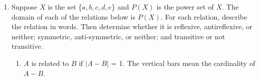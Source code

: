 \documentclass{article}
\begin{document}
\begin{enumerate}
\begin{itemize}
    \item Matrix:\\
        $\begin{pNiceMatrix}[first-row,first-col]
           & 1 & 2 & 6 & 7 & 11  \\
        1  & 1 & 0 & 0 & 1 & 0   \\ 
        2  & 0 & 1 & 0 & 0 & 1   \\
        6  & 0 & 0 & 1 & 0 & 0   \\
        7  & 1 & 0 & 0 & 1 & 0   \\
        11 & 0 & 1 & 0 & 0 & 1   \\
        \end{pNiceMatrix}$
        \hspace{1cm} Matrix = 
        $\begin{cases}
            1: m \equiv n \pmod{3}\\
            0: otherwise\\  
        \end{cases}$ \\
    
    \item \begin{itemize}
        \item R is reflexive as the diagnol of the matrix consist on only 1's.
        \item R is symmetric as since $\forall$ $m$ and $n$, (m,n) and (n,m) are 1's.
        \item R is transitive as $\forall$ $m$ and $n \in R$, if $mRn$ and $nRm$ then $mRm$ and $nRn$.
     \end{itemize}
    \item R is an equivalence relation since it is reflexive,symmetric, and transitive for the reasons mentioned above.
\end{itemize}

\pagebreak %

\item Suppose $X$ is the set \{$a,b,c,d,e$\} and $P(X)$ is the power set of $X$. 
The domain of each of the relations below is $P(X)$. 
For each relation, describe the relation in words. Then determine whether it is 
reflexive, antireflexive, or neither; symmetric, anti-symmetric, or neither; and 
transitive or not transitive.

\begin{enumerate}
    \item $A$ is related to $B$ if $\lvert A-B \rvert$ = 1. The 
    vertical bars mean the cardinality of $A - B$.
    \begin{enumerate}


\end{enumerate}
\end{enumerate}
\end{enumerate}
\end{document}

